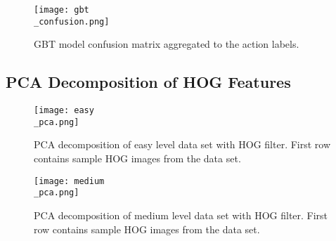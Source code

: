 \documentclass[
	a4paper, %
	10pt, %
	unnumberedsections, %
	twoside, %
]{t0004}
\begin{document}
\begin{appendices}
\begin{figure}[H]
	\texttt{[image: gbt\\\_confusion.png]}
	\caption{GBT model confusion matrix aggregated to the action labels.}
	\label{fig:gbtconfusion}
\end{figure}

\subsection{PCA Decomposition of HOG Features}

\begin{figure}[H]
	\texttt{[image: easy\\\_pca.png]}
	\caption{PCA decomposition of easy level data set with HOG filter. First row contains sample HOG images from the data set.}
	\label{fig:easypca}
\end{figure}

\begin{figure}[H]
	\texttt{[image: medium\\\_pca.png]}
	\caption{PCA decomposition of medium level data set with HOG filter. First row contains sample HOG images from the data set.}
	\label{fig:mediumpca}
\end{figure}

\end{appendices}
\end{document}
